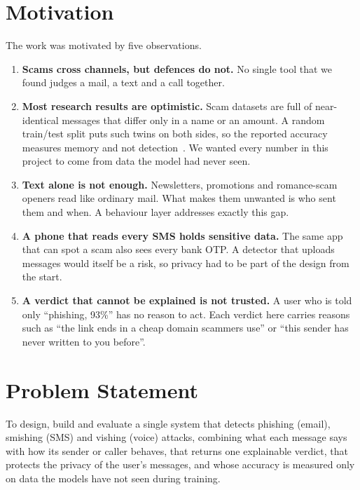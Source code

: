 {\section{Motivation}
The work was motivated by five observations.
\begin{enumerate}
\item \textbf{Scams cross channels, but defences do not.} No single tool that we found judges a mail, a text and a call together.
\item \textbf{Most research results are optimistic.} Scam datasets are full of near-identical messages that differ only in a name or an amount. A random train/test split puts such twins on both sides, so the reported accuracy measures memory and not detection~\cite{arp2022dos,kapoor2023leakage}. We wanted every number in this project to come from data the model had never seen.
\item \textbf{Text alone is not enough.} Newsletters, promotions and romance-scam openers read like ordinary mail. What makes them unwanted is who sent them and when. A behaviour layer addresses exactly this gap.
\item \textbf{A phone that reads every SMS holds sensitive data.} The same app that can spot a scam also sees every bank OTP. A detector that uploads messages would itself be a risk, so privacy had to be part of the design from the start.
\item \textbf{A verdict that cannot be explained is not trusted.} A user who is told only ``phishing, 93\%'' has no reason to act. Each verdict here carries reasons such as ``the link ends in a cheap domain scammers use'' or ``this sender has never written to you before''.
\end{enumerate}

\section{Problem Statement}
To design, build and evaluate a single system that detects phishing (email), smishing (SMS) and vishing (voice) attacks, combining what each message says with how its sender or caller behaves, that returns one explainable verdict, that protects the privacy of the user's messages, and whose accuracy is measured only on data the models have not seen during training.

}

